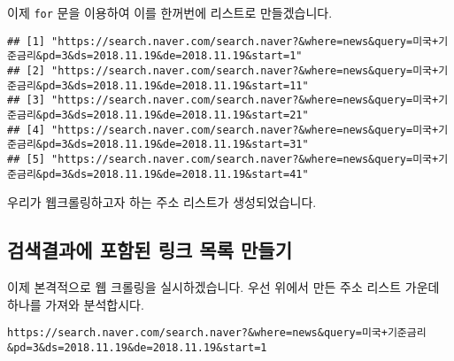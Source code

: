 \documentclass[]{article}
\newenvironment{Shaded}{\begin{snugshade}}{\end{snugshade}}
\newcommand{\CommentTok}[1]{\textcolor[rgb]{0.56,0.35,0.01}{\textit{#1}}}
\newcommand{\ControlFlowTok}[1]{\textcolor[rgb]{0.13,0.29,0.53}{\textbf{#1}}}
\newcommand{\DataTypeTok}[1]{\textcolor[rgb]{0.13,0.29,0.53}{#1}}
\newcommand{\DecValTok}[1]{\textcolor[rgb]{0.00,0.00,0.81}{#1}}
\newcommand{\KeywordTok}[1]{\textcolor[rgb]{0.13,0.29,0.53}{\textbf{#1}}}
\newcommand{\NormalTok}[1]{#1}
\newcommand{\StringTok}[1]{\textcolor[rgb]{0.31,0.60,0.02}{#1}}
\begin{document}
이제 \texttt{for} 문을 이용하여 이를 한꺼번에 리스트로 만들겠습니다.

\begin{Shaded}
\end{Shaded}

\begin{verbatim}
## [1] "https://search.naver.com/search.naver?&where=news&query=미국+기준금리&pd=3&ds=2018.11.19&de=2018.11.19&start=1" 
## [2] "https://search.naver.com/search.naver?&where=news&query=미국+기준금리&pd=3&ds=2018.11.19&de=2018.11.19&start=11"
## [3] "https://search.naver.com/search.naver?&where=news&query=미국+기준금리&pd=3&ds=2018.11.19&de=2018.11.19&start=21"
## [4] "https://search.naver.com/search.naver?&where=news&query=미국+기준금리&pd=3&ds=2018.11.19&de=2018.11.19&start=31"
## [5] "https://search.naver.com/search.naver?&where=news&query=미국+기준금리&pd=3&ds=2018.11.19&de=2018.11.19&start=41"
\end{verbatim}

우리가 웹크롤링하고자 하는 주소 리스트가 생성되었습니다.

\hypertarget{----}{%
\subsection{검색결과에 포함된 링크 목록 만들기}\label{----}}

이제 본격적으로 웹 크롤링을 실시하겠습니다. 우선 위에서 만든 주소 리스트
가운데 하나를 가져와 분석합시다.

\begin{verbatim}
https://search.naver.com/search.naver?&where=news&query=미국+기준금리&pd=3&ds=2018.11.19&de=2018.11.19&start=1
\end{verbatim}
\end{document}
